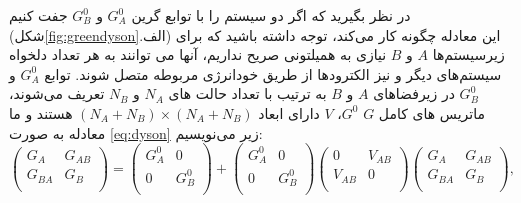 در نظر بگیرید که اگر دو سیستم را با توابع گرین $G^{0}_{A}$ و $G^{0}_{B}$ جفت کنیم (شکل\ref{fig:greendyson}.الف) این معادله چگونه کار می‌کند، توجه داشته باشید که برای زیرسیستم‌ها $A$ و $B$ نیازی به همیلتونی صریح نداریم، آنها می توانند به هر تعداد دلخواه سیستم‌های دیگر و نیز الکترودها از طریق خودانرژی مربوطه متصل شوند. توابع $G^{0}_{A}$ و $G^{0}_{B}$ در زیرفضاهای $A$ و $B$ به ترتیب با تعداد حالت های $N_A$ و $N_B$ تعریف می‌شوند، ماتریس های کامل $G$ $G^0$، $V$ دارای ابعاد $(N_A + N_B) \times (N_A + N_B)$ هستند و ما معادله به صورت \ref{eq:dyson} زیر می‌نویسیم:
\begin{equation}
    \left( \begin{matrix}
           {{G}_{A}} & {{G}_{AB}}  \\
           {{G}_{BA}} & {{G}_{B}}  \\
        \end{matrix} \right)=\left( \begin{matrix}
           G_{A}^{0} & 0  \\
           0 & G_{B}^{0}  \\
        \end{matrix} \right)+\left( \begin{matrix}
           G_{A}^{0} & 0  \\
           0 & G_{B}^{0}  \\
        \end{matrix} \right)\left( \begin{matrix}
           0 & {{V}_{AB}}  \\
           {{V}_{AB}} & 0  \\
        \end{matrix} \right)\left( \begin{matrix}
           {{G}_{A}} & {{G}_{AB}}  \\
           {{G}_{BA}} & {{G}_{B}}  \\
        \end{matrix} \right),
\end{equation}

